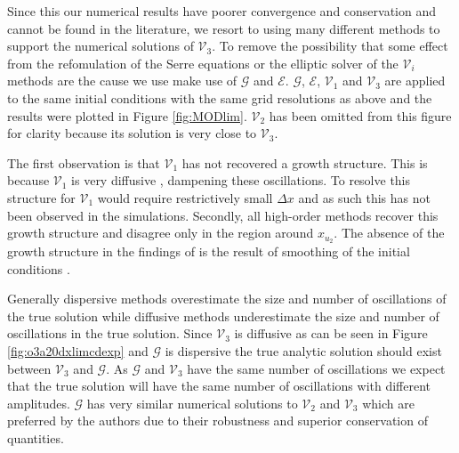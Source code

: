 \documentclass[times]{elsarticle}
\begin{document}
Since this our numerical results have poorer convergence and conservation and cannot be found in the literature, we resort to using many different methods to support the numerical solutions of $\mathcal{V}_3$. To remove the possibility that some effect from the refomulation of the Serre equations or the elliptic solver of the $\mathcal{V}_i$ methods are the cause we use make use of $\mathcal{G}$ and $\mathcal{E}$. $\mathcal{G}$, $\mathcal{E}$, $\mathcal{V}_1$ and $\mathcal{V}_3$ are applied to the same initial conditions with the same grid resolutions as above and the results were plotted in Figure \ref{fig:MODlim}. $\mathcal{V}_2$ has been omitted from this figure for clarity because its solution is very close to $\mathcal{V}_3$. 

The first observation is that $\mathcal{V}_1$ has not recovered a growth structure. This is because $\mathcal{V}_1$ is very diffusive \cite{Zoppou-etal-2017}, dampening these oscillations. To resolve this structure for $\mathcal{V}_1$ would require restrictively small $\Delta x$ and as such this has not been observed in the simulations. Secondly, all high-order methods recover this growth structure and disagree only in the region around $x_{u_2}$. The absence of the growth structure in the findings of \citet{El-etal-2006} is the result of smoothing of the initial conditions \cite{El-Hoefer-2016-11}.

Generally dispersive methods overestimate the size and number of oscillations of the true solution while diffusive methods underestimate the size and number of oscillations in the true solution. Since $\mathcal{V}_3$ is diffusive as can be seen in Figure \ref{fig:o3a20dxlimcdexp} and $\mathcal{G}$ is dispersive the true analytic solution should exist between $\mathcal{V}_3$ and $\mathcal{G}$. As $\mathcal{G}$ and $\mathcal{V}_3$ have the same number of oscillations we expect that the true solution will have the same number of oscillations with different amplitudes. $\mathcal{G}$ has very similar numerical solutions to $\mathcal{V}_2$ and $\mathcal{V}_3$  which are preferred by the authors due to their robustness and superior conservation of quantities. 
\end{document}
